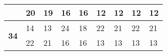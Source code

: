 \begin{table}[!htbp]
{\begin{tabular}{|c|ll|ll|ll|ll|}
                                 & \multicolumn{1}{l|}{20}                                                                                 & 19                                                                                                   & \multicolumn{1}{l|}{16}                                                                                 & 16                                                                                                   & \multicolumn{1}{l|}{12}                                                                                 & 12                                                                                                   & \multicolumn{1}{l|}{12}                                                                                 & 12                                                                                                   \\ \hline
\multirow{2}{*}{\textbf{34}}     & \multicolumn{1}{l|}{14}                                                                                 & 13                                                                                                   & \multicolumn{1}{l|}{24}                                                                                 & 18                                                                                                   & \multicolumn{1}{l|}{22}                                                                                 & 21                                                                                                   & \multicolumn{1}{l|}{22}                                                                                 & 21                                                                                                   \\ \cline{2-9} 
                                 & \multicolumn{1}{l|}{22}                                                                                 & 21                                                                                                   & \multicolumn{1}{l|}{16}                                                                                 & 16                                                                                                   & \multicolumn{1}{l|}{13}                                                                                 & 13                                                                                                   & \multicolumn{1}{l|}{13}                                                                                 & 13                                                                                                   \\ \hline

\end{tabular}}
\end{table}
